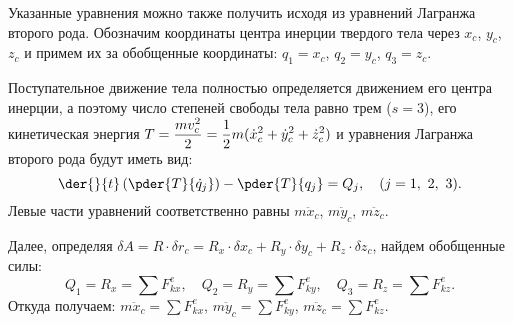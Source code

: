 Указанные уравнения можно также получить исходя из уравнений Лагранжа второго рода.
Обозначим координаты центра инерции твердого тела через \( x_c \), \( y_c \),
\( z_c \) и примем их за обобщенные координаты: \( q_1 = x_c \),
\( q_2 = y_c \), \( q_3 = z_c \).

Поступательное движение тела полностью определяется движением его центра
инерции, а поэтому число степеней свободы тела равно трем (\( s = 3 \)), его
кинетическая энергия \( \displaystyle T = \frac{mv_c^2}{2} = \frac{1}{2}m(\dot{x}_c^2 +
\dot{y}_c^2 + \dot{z}_c^2) \) и уравнения Лагранжа второго рода будут иметь вид:
\[
    \der{}{t}\left( \pder{T}{\dot{q}_j} \right) - \pder{T}{q_j} = Q_j, \quad
    (j = 1,\ 2,\ 3).
\]
Левые части уравнений соответственно равны \( m\ddot{x}_c \), \( m\ddot{y}_c \),
\( m\ddot{z}_c \).

Далее, определяя \( \delta A = R\cdot\delta r_c = R_x\cdot\delta x_c +
R_y\cdot\delta y_c + R_z\cdot\delta z_c \), найдем обобщенные силы:
\[
    Q_1 = R_x = \sum F^e_{kx}, \quad Q_2 = R_y = \sum F^e_{ky}, \quad
    Q_3 = R_z = \sum F^e_{kz}.
\]
Откуда получаем: \( m\ddot{x}_c = \sum F^e_{kx} \),
\( m\ddot{y}_c = \sum F^e_{ky} \), \( m\ddot{z}_c = \sum F^e_{kz} \).
\newpage
